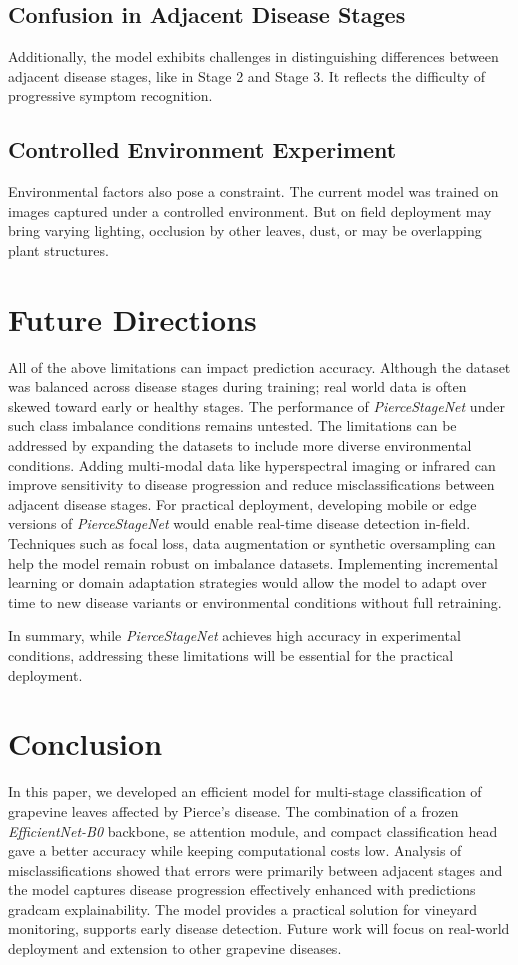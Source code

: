 \documentclass[conference]{IEEEtran}
\begin{document}
\subsection{Confusion in Adjacent Disease Stages}
Additionally, the model exhibits challenges in distinguishing differences between adjacent disease stages, like in Stage 2 and Stage 3. It reflects the difficulty of progressive symptom recognition.
\subsection{Controlled Environment Experiment}
Environmental factors also pose a constraint. The current model was trained on images captured under a controlled environment. But on field deployment may bring varying lighting, occlusion by other leaves, dust, or may be overlapping plant structures.

\section{Future Directions}
\label{sec:future}
All of the above limitations can impact prediction accuracy. Although the dataset was balanced across disease stages during training; real world data is often skewed toward early or healthy stages. The performance of \textit{PierceStageNet} under such class imbalance conditions remains untested.
The limitations can be addressed by expanding the datasets to include more diverse environmental conditions. Adding multi-modal data like hyperspectral imaging or infrared can improve sensitivity to disease progression and reduce misclassifications between adjacent disease stages. For practical deployment, developing mobile or edge versions of \textit{PierceStageNet} would enable real-time disease detection in-field. Techniques such as focal loss, data augmentation or synthetic oversampling can help the model remain robust on imbalance datasets. Implementing incremental learning or domain adaptation strategies would allow the model to adapt over time to new disease variants or environmental conditions without full retraining.

In summary, while \textit{PierceStageNet} achieves high accuracy in experimental conditions, addressing these limitations will be essential for the practical deployment.


\section{Conclusion}
\label{sec:con}
In this paper, we developed an efficient model for multi-stage classification of grapevine leaves affected by Pierce's disease. The combination of a frozen \textit{EfficientNet-B0} backbone, \ac{se} attention module, and compact classification head gave a better accuracy while keeping computational costs low. Analysis of misclassifications showed that errors were primarily between adjacent stages and the model captures disease progression effectively enhanced with predictions \ac{gradcam} explainability. The model provides a practical solution for vineyard monitoring, supports early disease detection. Future work will focus on real-world deployment and extension to other grapevine diseases.

\vspace{12pt}
\color{black}



\end{document}
